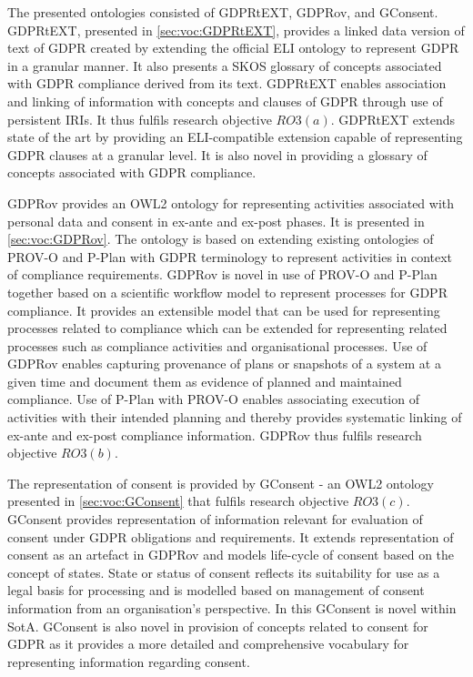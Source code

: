 The presented ontologies consisted of GDPRtEXT, GDPRov, and GConsent.
GDPRtEXT, presented in \autoref{sec:voc:GDPRtEXT}, provides a linked data version of text of GDPR created by extending the official ELI \cite{ELI_2012} ontology to represent GDPR in a granular manner. It also presents a SKOS glossary of concepts associated with GDPR compliance derived from its text. GDPRtEXT enables association and linking of information with concepts and clauses of GDPR through use of persistent IRIs. It thus fulfils research objective $RO3(a)$. GDPRtEXT extends state of the art by providing an ELI-compatible extension capable of representing GDPR clauses at a granular level. It is also novel in providing a glossary of concepts associated with GDPR compliance.

GDPRov provides an OWL2 ontology for representing activities associated with personal data and consent in ex-ante and ex-post phases. It is presented in \autoref{sec:voc:GDPRov}.
The ontology is based on extending existing ontologies of PROV-O \cite{lebo_prov-o_2013} and P-Plan \cite{garijo_p-plan_2014} with GDPR terminology  to represent activities in context of compliance requirements. GDPRov is novel in use of PROV-O and P-Plan together based on a scientific workflow model to represent processes for GDPR compliance.
It provides an extensible model that can be used for representing processes related to compliance which can be extended for representing related  processes such as compliance activities and organisational processes.
Use of GDPRov enables capturing provenance of plans or snapshots of a system at a given time and document them as evidence of planned and maintained compliance.
Use of P-Plan with PROV-O enables associating execution of activities with their intended planning and thereby provides systematic linking of ex-ante and ex-post compliance information.
GDPRov thus fulfils research objective $RO3(b)$.

The representation of consent is provided by GConsent - an OWL2 ontology presented in \autoref{sec:voc:GConsent} that fulfils research objective $RO3(c)$.
GConsent provides representation of information relevant for evaluation of consent under GDPR obligations and requirements.
It extends representation of consent as an artefact in GDPRov and models life-cycle of consent based on the concept of states.
State or status of consent reflects its suitability for use as a legal basis for processing and is modelled based on management of consent information from an organisation's perspective. In this GConsent is novel within SotA.
GConsent is also novel in provision of concepts related to consent for GDPR as it provides a more detailed and comprehensive vocabulary for representing information regarding consent.

